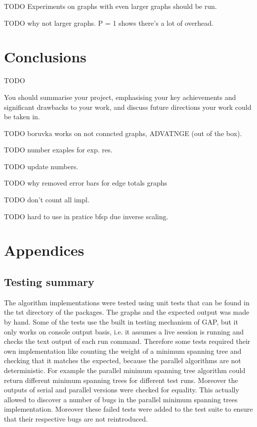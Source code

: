 \documentclass{report}
\theoremstyle{plain}
\theoremstyle{definition}
\theoremstyle{remark}
\begin{document}
TODO Experiments on graphs with even larger graphs should be run.

TODO why not larger graphs. P = 1 shows there's a lot of overhead.

\chapter{Conclusions}

TODO

You should summarise your project, emphasising your key achievements
and significant drawbacks to your work, and discuss future directions your
work could be taken in.


TODO boruvka works on not conncted graphs, ADVATNGE (out of the box).

TODO number exaples for exp. res.

TODO update numbers.

TODO why removed error bars for edge totals graphs

TODO don't count all impl.

TODO hard to use in pratice bfsp due inverse scaling.

\chapter{Appendices}

\section{Testing summary}

The algorithm implementations were tested using unit tests that can be found in the tst directory of the packages. The graphs and the expected output was made by hand. Some of the tests use the built in testing mechanism of GAP, but it only works on console output basis, i.e. it assumes a live session is running and checks the text output of each run command. Therefore some tests required their own implementation like counting the weight of a minimum spanning tree and checking that it matches the expected, because the parallel algorithms are not deterministic. For example the parallel minimum spanning tree algorithm could return different minimum spanning trees for different test runs. Moreover the outputs of serial and parallel versions were checked for equality. This actually allowed to discover a number of bugs in the parallel minimum spanning trees implementation. Moreover these failed tests were added to the test suite to ensure that their respective bugs are not reintroduced.



\end{document}

